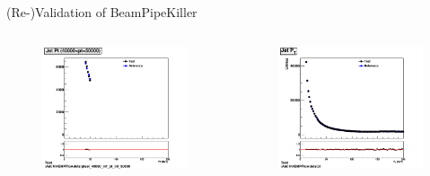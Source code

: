 \begin{frame}{(Re-)Validation of BeamPipeKiller}
    \begin{columns}
        \begin{column}{0.5\textwidth}
            \begin{figure}
                \centering
                \includegraphics[width = \textwidth]{beam_highpT}
            \end{figure}
        \end{column}
        \begin{column}{0.5\textwidth}
            \begin{figure}
                \centering
                \includegraphics[width = \textwidth]{beam_pT}

\end{figure}
\end{column}
\end{columns}
\end{frame}

